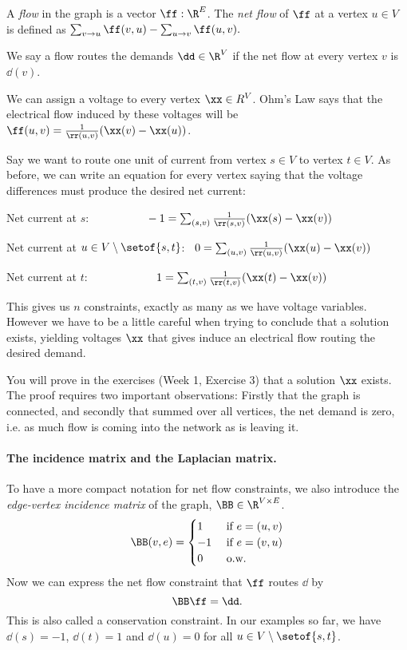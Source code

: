 A \emph{flow} in the graph is a vector $\ff: \R^E$.
%
The \emph{net flow} of $\ff$ at a vertex $u \in V$ is defined as
$\sum_{v \to u} \ff(v,u) - \sum_{u  \to v} \ff(u,v).$

We say a flow routes the demands $\dd \in \R^V$ if the net flow at
every vertex $v$ is $\dd(v)$.

We can assign a voltage to every vertex $\xx \in R^V$.
Ohm's Law says that the electrical flow induced by these voltages will
be $\ff(u,v) = \frac{1}{\rr(u,v)} (\xx(v) - \xx(u))$.

Say we want to route one unit of current from vertex $s \in V$ to vertex
$t \in V$.
As before, we can write an equation for every vertex saying that the
voltage differences must produce the desired net current:
\begin{tight_itemize}
\item Net current at $s$:
  $\phantom{----,,,}-1 = \sum_{(s,v)} \frac{1}{\rr(s,v)} (\xx(s) - \xx(v))$
\item Net current at $u \in V\setminus\setof{s,t}$:
  $\phantom{..} 0 = \sum_{(u,v)} \frac{1}{\rr(u,v)} (\xx(u) - \xx(v))$
\item Net current at  $t$:  $\phantom{------,} 1=\sum_{(t,v)} \frac{1}{\rr(t,v)} (\xx(t) - \xx(v))$
\end{tight_itemize}
This gives us $n$ constraints, exactly as many as we have voltage
variables.
However we have to be a little careful when trying to conclude that a
solution exists, yielding voltages $\xx$ that gives induce an
electrical flow routing the desired demand.


You will prove in the exercises (Week 1, Exercise 3) that a solution $\xx$ exists. The proof requires two
important observations: Firstly that the graph is connected, and
secondly that summed over all vertices, the net demand is zero,
i.e. as much flow is coming into the network as is leaving it.

\paragraph{The incidence matrix and the Laplacian matrix.}
To have a more compact notation for net flow constraints, we also
introduce the \emph{edge-vertex incidence matrix} of the graph,
$\BB \in \R^{V \times E}$.
\[
  \BB(v,e) =
  \begin{cases}
    1 & \text{ if } e = (u,v) \\
    -1 &\text{ if } e = (v,u) \\
    0 &\text{ o.w.}
  \end{cases}
\]
%
Now we can express the net flow constraint that $\ff$ routes $\dd$ by
\[
  \BB \ff = \dd
  .
\]
This is also called a conservation constraint. In our examples so far,
we have $\dd(s) = -1$, $\dd(t) = 1$ and $\dd(u) = 0$ for all $u\in V\setminus\setof{s,t}$.

